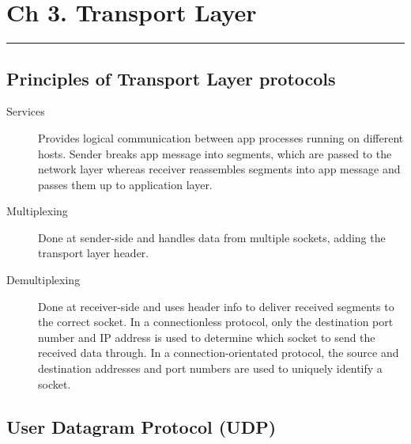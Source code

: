 \documentclass{article}
\begin{document}
\newpage

\section*{Ch 3. Transport Layer}
\noindent
\rule{\linewidth}{0.5mm}
\noindent

\subsection*{Principles of Transport Layer protocols}

\begin{description}
    \item[Services] Provides logical communication between app processes running on different hosts.
    Sender breaks app message into segments, which are passed to the network layer whereas receiver
    reassembles segments into app message and passes them up to application layer.
    
    \item[Multiplexing] Done at sender-side and handles data from multiple sockets, adding the 
    transport layer header.
    
    \item[Demultiplexing] Done at receiver-side and uses header info to deliver received segments to
    the correct socket. In a connectionless protocol, only the destination port number and IP 
    address is used to determine which socket to send the received data through. In a
    connection-orientated protocol, the source and destination addresses and port numbers are used to
    uniquely identify a socket.
\end{description}

\subsection*{User Datagram Protocol (UDP)}
\end{document}
